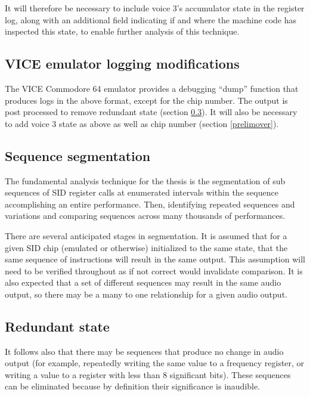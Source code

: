 \documentclass[10pt]{article}
\begin{document}
\begin{multicols*}{2}
It will therefore be necessary to include voice 3’s accumulator state in the register log, along with an additional field indicating if and where the machine code has inspected this state, to enable further analysis of this technique.

\subsection{VICE emulator logging modifications}

The VICE Commodore 64 emulator\cite{asidvice} provides a debugging “dump” function that produces logs in the above format, except for the chip number. The output is post processed to remove redundant state (section \ref{redundantstate}). It will also be necessary to add voice 3 state as above as well as chip number (section \ref{prelimover}).

\subsection{Sequence segmentation}

The fundamental analysis technique for the thesis is the segmentation of sub sequences of SID register calls at enumerated intervals within the sequence accomplishing an entire performance. Then, identifying repeated sequences and variations and comparing sequences across many thousands of performances.

There are several anticipated stages in segmentation. It is assumed that for a given SID chip (emulated or otherwise) initialized to the same state, that the same sequence of instructions will result in the same output. This assumption will need to be verified throughout as if not correct would invalidate comparison. It is also expected that a set of different sequences may result in the same audio output, so there may be a many to one relationship for a given audio output.

\subsection{Redundant state}
\label{redundantstate}

It follows also that there may be sequences that produce no change in audio output (for example, repeatedly writing the same value to a frequency register, or writing a value to a register with less than 8 significant bits). These sequences can be eliminated because by definition their significance is inaudible.


\end{multicols*}
\end{document}
